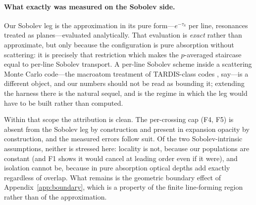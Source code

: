 \documentclass[fleqn,usenatbib]{mnras}
\newcommand{\taus}{\tau_{\mathrm{S}}}
\begin{document}
\paragraph{What exactly was measured on the Sobolev side.}
Our Sobolev leg is the approximation in its pure form---$e^{-\taus}$ per
line, resonances treated as planes---evaluated analytically. That evaluation
is \emph{exact} rather than approximate, but only because the configuration
is pure absorption without scattering: it is precisely that restriction which
makes the $p$-averaged staircase equal to per-line Sobolev transport. A
per-line Sobolev scheme inside a scattering Monte Carlo code---the
macroatom treatment of TARDIS-class codes \citep{lucy2002,lucy2003,tardis},
say---is a
different object, and our numbers should not be read as bounding it;
extending the harness there is the natural sequel, and is the regime in which
the leg would have to be built rather than computed.

Within that scope the attribution is clean. The per-crossing cap (F4, F5) is
absent from the Sobolev leg by construction and present in expansion opacity
by construction, and the measured errors follow suit. Of the two
Sobolev-intrinsic assumptions, neither is stressed here: locality is not,
because our populations are constant (and F1 shows it would cancel at leading
order even if it were), and isolation cannot be, because in pure absorption
optical depths add exactly regardless of overlap. What remains is the
geometric boundary effect of Appendix~\ref{app:boundary}, which is a property
of the finite line-forming region rather than of the approximation.
\end{document}
